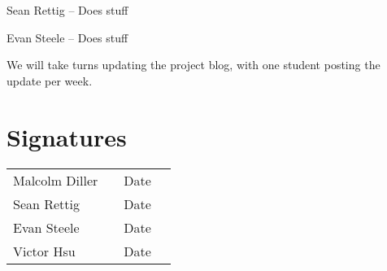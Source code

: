 \documentclass[12pt]{article}
\begin{document}
Sean Rettig -- Does stuff

Evan Steele -- Does stuff

We will take turns updating the project blog, with one student posting the
update per week.

\section{Signatures}

\begin{tabular}{l l l l} Malcolm Diller & \underline{\hspace{6cm}} & Date
\underline{\hspace{2cm}}\\ Sean Rettig & \underline{\hspace{6cm}} & Date
\underline{\hspace{2cm}}\\ Evan Steele & \underline{\hspace{6cm}} & Date
\underline{\hspace{2cm}}\\ Victor Hsu & \underline{\hspace{6cm}} & Date
\underline{\hspace{2cm}} \end{tabular}
    
\end{document}
